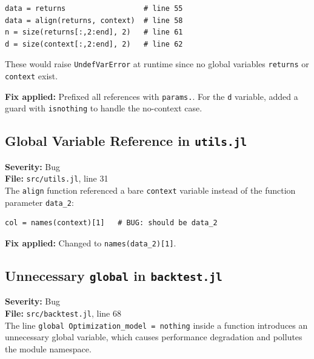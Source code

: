 \documentclass[11pt,a4paper]{article}
\begin{document}
\begin{lstlisting}
data = returns                  # line 55
data = align(returns, context)  # line 58
n = size(returns[:,2:end], 2)   # line 61
d = size(context[:,2:end], 2)   # line 62
\end{lstlisting}

These would raise \texttt{UndefVarError} at runtime since no global variables
\texttt{returns} or \texttt{context} exist.

\textbf{Fix applied:} Prefixed all references with \texttt{params.}. For the
\texttt{d} variable, added a guard with \texttt{isnothing} to handle the
no-context case.

\subsection{Global Variable Reference in \texttt{utils.jl}}
\label{sec:utils-context}

\textbf{Severity:} Bug\\
\textbf{File:} \texttt{src/utils.jl}, line 31\\[0.3em]
The \texttt{align} function referenced a bare \texttt{context} variable instead of
the function parameter \texttt{data\_2}:

\begin{lstlisting}
col = names(context)[1]   # BUG: should be data_2
\end{lstlisting}

\textbf{Fix applied:} Changed to \texttt{names(data\_2)[1]}.

\subsection{Unnecessary \texttt{global} in \texttt{backtest.jl}}
\label{sec:global}

\textbf{Severity:} Bug\\
\textbf{File:} \texttt{src/backtest.jl}, line 68\\[0.3em]
The line \texttt{global Optimization\_model = nothing} inside a function introduces
an unnecessary global variable, which causes performance degradation and pollutes
the module namespace.
\end{document}
